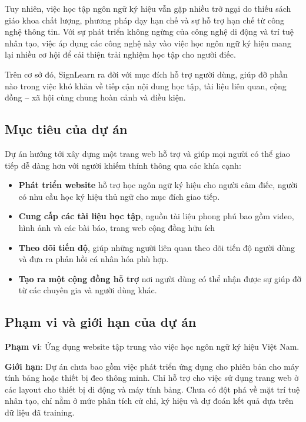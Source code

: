 \documentclass[a4paper,12pt]{article}
\begin{document}
\noindent Tuy nhiên, việc học tập ngôn ngữ ký hiệu vẫn gặp nhiều trở ngại do thiếu sách giáo khoa chất lượng, phương pháp dạy hạn chế và sự hỗ trợ hạn chế từ công nghệ thông tin. Với sự phát triển không ngừng của công nghệ di động và trí tuệ nhân tạo, việc áp dụng các công nghệ này vào việc học ngôn ngữ ký hiệu mang lại nhiều cơ hội để cải thiện trải nghiệm học tập cho người điếc.

\noindent Trên cơ sở đó, SignLearn ra đời với mục đích hỗ trợ người dùng, giúp đỡ phần nào trong việc khó khăn về tiếp cận nội dung học tập, tài liệu liên quan, cộng đồng – xã hội cùng chung hoàn cảnh và điều kiện.


\subsection{Mục tiêu của dự án}
Dự án hướng tới xây dựng một trang web hỗ trợ và giúp mọi người có thể giao tiếp dễ dàng hơn với người khiếm thính thông qua các khía cạnh:
\begin{itemize}
    \item \textbf{Phát triển website} hỗ trợ học ngôn ngữ ký hiệu cho người câm điếc, người có nhu cầu học ký hiệu thủ ngữ cho mục đích giao tiếp.

    \item \textbf{Cung cấp các tài liệu học tập}, nguồn tài liệu phong phú bao gồm video, hình ảnh và các bài báo, trang web cộng đồng hữu ích
    
    \item \textbf{Theo dõi tiến độ}, giúp những người liên quan theo dõi tiến độ người dùng và đưa ra phản hồi cá nhân hóa phù hợp.
    
    \item \textbf{Tạo ra một cộng đồng hỗ trợ} nơi người dùng có thể nhận được sự giúp đỡ từ các chuyên gia và người dùng khác.
\end{itemize}


\subsection{Phạm vi và giới hạn của dự án}
\noindent \textbf{Phạm vi}: Ứng dụng website tập trung vào việc học ngôn ngữ ký hiệu Việt Nam.

\noindent \textbf{Giới hạn}: Dự án chưa bao gồm việc phát triển ứng dụng cho phiên bản cho máy tính bảng hoặc thiết bị đeo thông minh. Chỉ hỗ trợ cho việc sử dụng trang web ở các layout cho thiết bị di động và máy tính bảng. Chưa có đột phá về mặt trí tuệ nhân tạo, chỉ nằm ở mức phân tích cử chỉ, ký hiệu và dự đoán kết quả dựa trên dữ liệu đã training.
\end{document}
